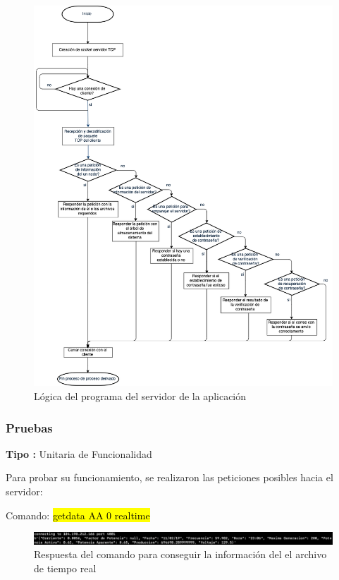 \begin{figure}[H]
	\centering
	\includegraphics[scale=.4]{Capitulo5/images/logica_server_tcp.png}
	\caption{Lógica del programa del servidor de la aplicación}
	\label{fig:programa del servidor aplicacion}
\end{figure} 

\subsubsection{Pruebas}
\textbf{Tipo :} Unitaria de Funcionalidad \\ \newline

Para probar su funcionamiento, se realizaron las peticiones posibles hacia el servidor:

Comando: \hl{getdata AA 0 realtime}
\begin{figure}[H]
	\centering
	\includegraphics[scale=.3]{Capitulo5/images/get_data.png}
	\caption{Respuesta del comando para conseguir la información del el archivo de tiempo real}
	\label{fig:}
\end{figure} 

